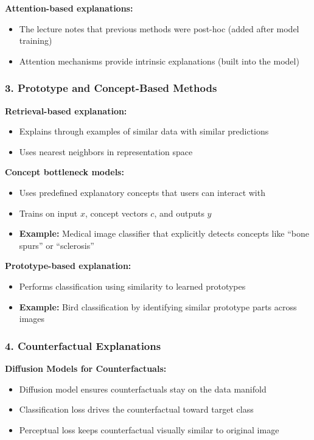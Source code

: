 \textbf{Attention-based explanations:}
\begin{itemize}
    \item The lecture notes that previous methods were post-hoc (added after model training)
    \item Attention mechanisms provide intrinsic explanations (built into the model)
\end{itemize}

\subsubsection*{3. Prototype and Concept-Based Methods}

\textbf{Retrieval-based explanation:}
\begin{itemize}
    \item Explains through examples of similar data with similar predictions
    \item Uses nearest neighbors in representation space
\end{itemize}

\textbf{Concept bottleneck models:}
\begin{itemize}
    \item Uses predefined explanatory concepts that users can interact with
    \item Trains on input $x$, concept vectors $c$, and outputs $y$
    \item \textbf{Example:} Medical image classifier that explicitly detects concepts like ``bone spurs'' or ``sclerosis''
\end{itemize}

\textbf{Prototype-based explanation:}
\begin{itemize}
    \item Performs classification using similarity to learned prototypes
    \item \textbf{Example:} Bird classification by identifying similar prototype parts across images
\end{itemize}

\subsubsection*{4. Counterfactual Explanations}

\textbf{Diffusion Models for Counterfactuals:}
\begin{itemize}
    \item Diffusion model ensures counterfactuals stay on the data manifold
    \item Classification loss drives the counterfactual toward target class
    \item Perceptual loss keeps counterfactual visually similar to original image
\end{itemize}

